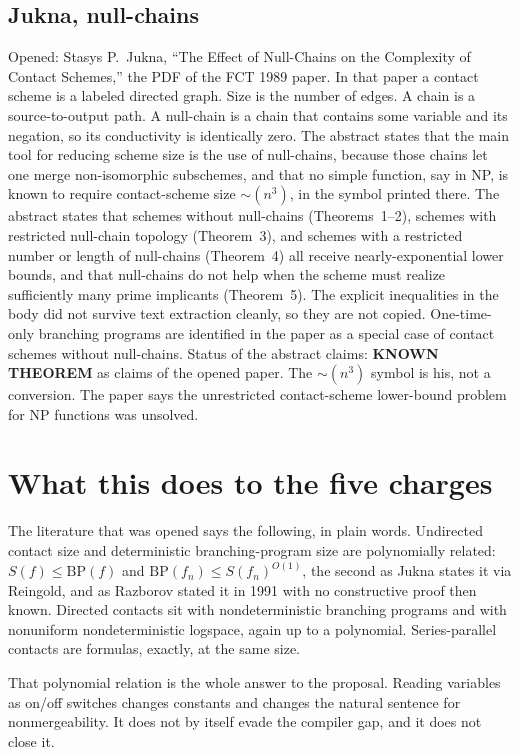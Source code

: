 \documentclass[11pt]{article}
\begin{document}
\subsection*{Jukna, null-chains}
Opened: Stasys P.\ Jukna, ``The Effect of Null-Chains on the Complexity of Contact Schemes,'' the PDF of the FCT 1989 paper.
In that paper a contact scheme is a labeled directed graph.
Size is the number of edges.
A chain is a source-to-output path.
A null-chain is a chain that contains some variable and its negation, so its conductivity is identically zero.
The abstract states that the main tool for reducing scheme size is the use of null-chains, because those chains let one merge non-isomorphic subschemes, and that no simple function, say in NP, is known to require contact-scheme size \(\sim(n^3)\), in the symbol printed there.
The abstract states that schemes without null-chains (Theorems~1--2), schemes with restricted null-chain topology (Theorem~3), and schemes with a restricted number or length of null-chains (Theorem~4) all receive nearly-exponential lower bounds, and that null-chains do not help when the scheme must realize sufficiently many prime implicants (Theorem~5).
The explicit inequalities in the body did not survive text extraction cleanly, so they are not copied.
One-time-only branching programs are identified in the paper as a special case of contact schemes without null-chains.
Status of the abstract claims: \textbf{KNOWN THEOREM} as claims of the opened paper.
The \(\sim(n^3)\) symbol is his, not a conversion.
The paper says the unrestricted contact-scheme lower-bound problem for NP functions was unsolved.

\section{What this does to the five charges}
The literature that was opened says the following, in plain words.
Undirected contact size and deterministic branching-program size are polynomially related: \(S(f)\le\mathrm{BP}(f)\) and \(\mathrm{BP}(f_n)\le S(f_n)^{O(1)}\), the second as Jukna states it via Reingold, and as Razborov stated it in 1991 with no constructive proof then known.
Directed contacts sit with nondeterministic branching programs and with nonuniform nondeterministic logspace, again up to a polynomial.
Series-parallel contacts are formulas, exactly, at the same size.

That polynomial relation is the whole answer to the proposal.
Reading variables as on/off switches changes constants and changes the natural sentence for nonmergeability.
It does not by itself evade the compiler gap, and it does not close it.
\end{document}
